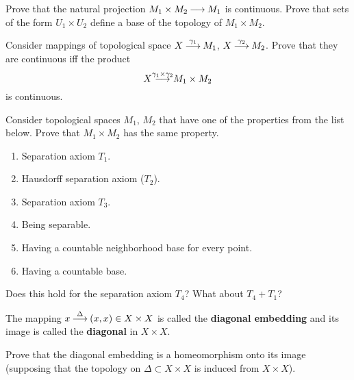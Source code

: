 \documentclass[12pt]{article}
\begin{document}
\begin{zadacha}
  Prove that the natural projection $M_1 \times M_2{\:\longrightarrow\:} M_1$ is
  continuous. Prove that sets of the form $U_1\times U_2$ define a
  base of the topology of $M_1 \times M_2$.
\end{zadacha}

\begin{zadacha}\label{_product_nepre_Zadacha_}
Consider mappings of topological space 
$X\overset{\gamma_1}{{\:\longrightarrow\:}} M_1$, $X\overset{\gamma_2}{{\:\longrightarrow\:}}
M_2$. Prove that they are continuous iff the product
\[
X\overset{\gamma_1\times \gamma_2}{{\:\longrightarrow\:}} M_1\times M_2
\]
is continuous.
\end{zadacha}

\begin{zadacha} 
Consider topological spaces $M_1$, $M_2$ that have one of the
properties from the list below. Prove that $M_1\times M_2$ has
the same property.
\begin{enumerate}
\item Separation axiom $T_1$.

\item\shrk{} Hausdorff separation axiom ($T_2$).

\item Separation axiom $T_3$.

\item Being separable.

\item\shrk{} Having a countable neighborhood base for every point.

\item Having a countable base.
\end{enumerate}
\end{zadacha}

\begin{zadacha}[**]
Does this hold for the separation axiom $T_4$? What about $T_4+T_1$?
\end{zadacha}

\begin{opredelenie}
The mapping $x\overset{\Delta}{{\:\longrightarrow\:}} (x,x)\in X\times X$
is called the {\bf diagonal embedding} and its image is called the
{\bf diagonal} in $X\times X$.
\end{opredelenie}

\begin{zadacha}
Prove that the diagonal embedding is a homeomorphism onto its image
(supposing that the topology on $\Delta\subset X\times X$ is induced
from $X\times X$).
\end{zadacha}
\end{document}
